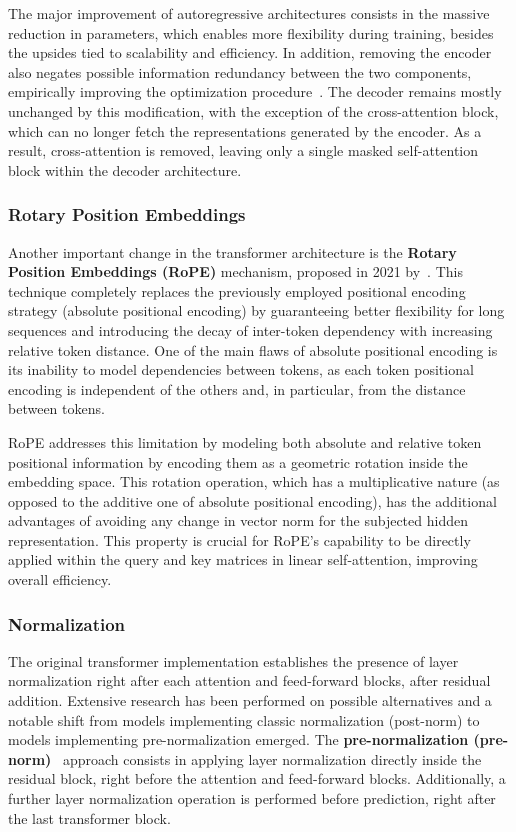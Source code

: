 The major improvement of autoregressive architectures consists in the massive reduction in parameters, which enables more flexibility during training, besides the upsides tied to scalability and efficiency.
In addition, removing the encoder also negates possible information redundancy between the two components, empirically improving the optimization procedure~\citet{liu2018}.
The decoder remains mostly unchanged by this modification, with the exception of the cross-attention block, which can no longer fetch the representations generated by the encoder.
As a result, cross-attention is removed, leaving only a single masked self-attention block within the decoder architecture.

\subsubsection*{Rotary Position Embeddings}

Another important change in the transformer architecture is the \textbf{Rotary Position Embeddings (RoPE)} mechanism, proposed in 2021 by~\citet{su2024}.
This technique completely replaces the previously employed positional encoding strategy (absolute positional encoding) by guaranteeing better flexibility for long sequences and introducing the decay of inter-token dependency with increasing relative token distance.
One of the main flaws of absolute positional encoding is its inability to model dependencies between tokens, as each token positional encoding is independent of the others and, in particular, from the distance between tokens.

RoPE addresses this limitation by modeling both absolute and relative token positional information by encoding them as a geometric rotation inside the embedding space.
This rotation operation, which has a multiplicative nature (as opposed to the additive one of absolute positional encoding), has the additional advantages of avoiding any change in vector norm for the subjected hidden representation.
This property is crucial for RoPE's capability to be directly applied within the query and key matrices in linear self-attention, improving overall efficiency.

\subsubsection*{Normalization}

The original transformer implementation establishes the presence of layer normalization right after each attention and feed-forward blocks, after residual addition.
Extensive research has been performed on possible alternatives and a notable shift from models implementing classic normalization (post-norm) to models implementing pre-normalization emerged.
The \textbf{pre-normalization (pre-norm)}~\cite{baevski2019,xiong2020} approach consists in applying layer normalization directly inside the residual block, right before the attention and feed-forward blocks.
Additionally, a further layer normalization operation is performed before prediction, right after the last transformer block.


